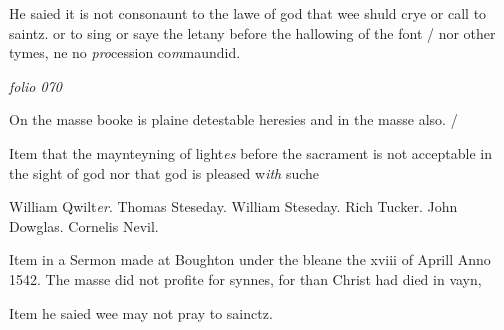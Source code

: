 \documentclass[12pt, a4paper]{book}
\begin{document}
			
 	
		\ifthenelse{\isodd{\thepage}}
		{\reversemarginpar}
		{\normalmarginpar}
		He saied it is not consonaunt to the lawe of god
 that wee shuld crye or call to saintz. or to sing
 or saye the letany before the hallowing of the
 font / nor other tymes, ne no \textit{pro}cession co\textit{m}maundid.



\dotfill
						\newpage
{}

\textit{folio 070}


	
		
				\marginpar[\vspace{0.5cm}{\textcolor{Gray}{offensive}}]{}
			
		
		\ifthenelse{\isodd{\thepage}}
		{\reversemarginpar}
		{\normalmarginpar}
		On the masse booke is plaine detestable heresies
	 and in the masse also. /
	
	 
	 	
			
	 	
		\ifthenelse{\isodd{\thepage}}
		{\reversemarginpar}
		{\normalmarginpar}
		Item that the maynteyning of light\textit{es} before the
	 sacrament is not acceptable in the sight of god
	 nor that god is pleased w\textit{ith} suche
	 	
		\ifthenelse{\isodd{\thepage}}
		{\reversemarginpar}
		{\normalmarginpar}
		William Qwilt\textit{er}. Thomas Steseday. William Steseday.
	 		Rich Tucker. John Dowglas. Cornelis Nevil.
			
		
		\ifthenelse{\isodd{\thepage}}
		{\reversemarginpar}
		{\normalmarginpar}
		Item in a Sermon made at Boughton under the
	 bleane the xviii of Aprill Anno 1542. The
	 masse did not profite for synnes, for than Christ
	 had died in vayn,
	 
 
			 
		\ifthenelse{\isodd{\thepage}}
		{\reversemarginpar}
		{\normalmarginpar}
		Item he saied wee may not pray to sainctz.
 
			 
\end{document}
